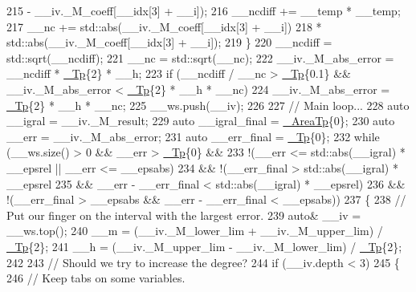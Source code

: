 \begin{DoxyCode}
215                                      - \_\_iv.\_M\_coeff[\_\_idx[3] + \_\_i]);
216           \_\_ncdiff += \_\_temp * \_\_temp;
217           \_\_nc += std::abs(\_\_iv.\_M\_coeff[\_\_idx[3] + \_\_i])
218                 * std::abs(\_\_iv.\_M\_coeff[\_\_idx[3] + \_\_i]);
219         \}
220       \_\_ncdiff = std::sqrt(\_\_ncdiff);
221       \_\_nc = std::sqrt(\_\_nc);
222       \_\_iv.\_M\_abs\_error = \_\_ncdiff * \hyperlink{namespace____gnu__cxx_a3b19a9c800ca194374ef9172290f7d79}{\_Tp}\{2\} * \_\_h;
223       \textcolor{keywordflow}{if} (\_\_ncdiff / \_\_nc > \hyperlink{namespace____gnu__cxx_a3b19a9c800ca194374ef9172290f7d79}{\_Tp}\{0.1\} && \_\_iv.\_M\_abs\_error < \hyperlink{namespace____gnu__cxx_a3b19a9c800ca194374ef9172290f7d79}{\_Tp}\{2\} * \_\_h * \_\_nc)
224         \_\_iv.\_M\_abs\_error = \hyperlink{namespace____gnu__cxx_a3b19a9c800ca194374ef9172290f7d79}{\_Tp}\{2\} * \_\_h * \_\_nc;
225       \_\_ws.push(\_\_iv);
226 
227       \textcolor{comment}{// Main loop...}
228       \textcolor{keyword}{auto} \_\_igral = \_\_iv.\_M\_result;
229       \textcolor{keyword}{auto} \_\_igral\_final = \hyperlink{namespace____gnu__cxx_ae97a51b75e19c30f48d27fac4664de6e}{\_AreaTp}\{0\};
230       \textcolor{keyword}{auto} \_\_err = \_\_iv.\_M\_abs\_error;
231       \textcolor{keyword}{auto} \_\_err\_final = \hyperlink{namespace____gnu__cxx_a3b19a9c800ca194374ef9172290f7d79}{\_Tp}\{0\};
232       \textcolor{keywordflow}{while} (\_\_ws.size() > 0 && \_\_err > \hyperlink{namespace____gnu__cxx_a3b19a9c800ca194374ef9172290f7d79}{\_Tp}\{0\} &&
233              !(\_\_err <= std::abs(\_\_igral) * \_\_epsrel || \_\_err <= \_\_epsabs)
234              && !(\_\_err\_final > std::abs(\_\_igral) * \_\_epsrel
235                   && \_\_err - \_\_err\_final < std::abs(\_\_igral) * \_\_epsrel)
236              && !(\_\_err\_final > \_\_epsabs && \_\_err - \_\_err\_final < \_\_epsabs))
237         \{
238           \textcolor{comment}{// Put our finger on the interval with the largest error.}
239           \textcolor{keyword}{auto}& \_\_iv = \_\_ws.top();
240           \_\_m = (\_\_iv.\_M\_lower\_lim + \_\_iv.\_M\_upper\_lim) / \hyperlink{namespace____gnu__cxx_a3b19a9c800ca194374ef9172290f7d79}{\_Tp}\{2\};
241           \_\_h = (\_\_iv.\_M\_upper\_lim - \_\_iv.\_M\_lower\_lim) / \hyperlink{namespace____gnu__cxx_a3b19a9c800ca194374ef9172290f7d79}{\_Tp}\{2\};
242 
243           \textcolor{comment}{// Should we try to increase the degree?}
244           \textcolor{keywordflow}{if} (\_\_iv.depth < 3)
245             \{
246               \textcolor{comment}{// Keep tabs on some variables.}

\end{DoxyCode}
